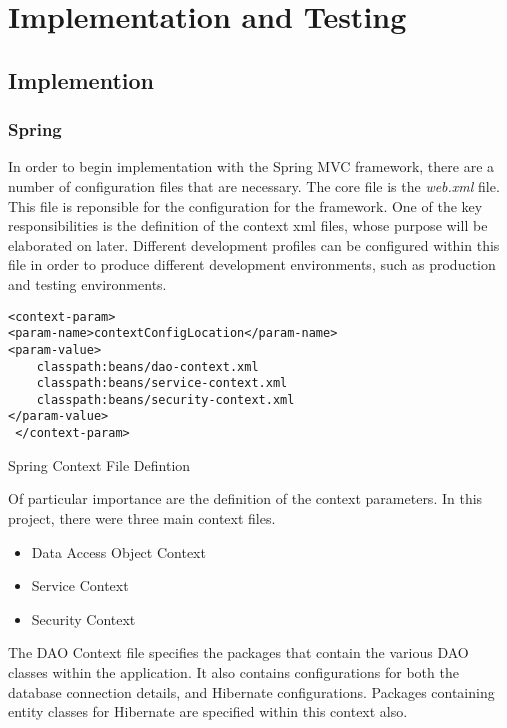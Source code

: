 \chapter{Implementation and Testing}
\label{impltesting}

\section{Implemention}
\subsection{Spring}
In order to begin implementation with the Spring MVC framework, there are a number of configuration files that are necessary. The core file is the \textit{web.xml} file. This file is reponsible for the configuration for the framework. One of the key responsibilities is the definition of the context xml files, whose purpose will be elaborated on later. Different development profiles can be configured within this file in order to produce different development environments, such as production and testing environments.\newline 

\begin{table}[H]
\begin{lstlisting}
<context-param>
<param-name>contextConfigLocation</param-name>
<param-value>
	classpath:beans/dao-context.xml
	classpath:beans/service-context.xml
	classpath:beans/security-context.xml
</param-value>
 </context-param>
\end{lstlisting}
\caption{Spring Context File Defintion}
\end{table}

Of particular importance are the definition of the context parameters. In this project, there were three main context files.\newline

\begin{itemize}
\item Data Access Object Context
\item Service Context
\item Security Context
\end{itemize}

The DAO Context file specifies the packages that contain the various DAO classes within the application. It also contains configurations for both the database connection details, and Hibernate configurations. Packages containing entity classes for Hibernate are specified within this context also. \newline


